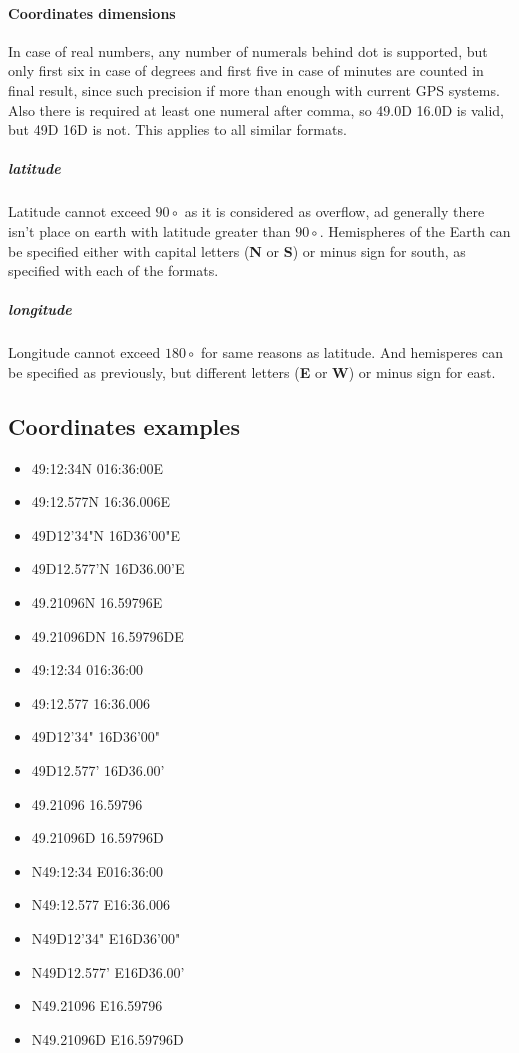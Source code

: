 \documentclass[12pt,titlepage]{article}
\begin{document}
\paragraph{Coordinates dimensions}
In case of real numbers, any number of numerals behind 
dot is supported, but only first six in case of degrees and first five in case of minutes are
counted in final result, since such precision if more than enough with current GPS systems. 
Also there is required at least one numeral after comma, so 49.0D 16.0D is valid, but 49D 16D 
is not. This applies to all similar formats.

\subparagraph{latitude}
Latitude cannot exceed $90\circ$ as it is considered as overflow, ad generally there isn't place 
on earth with latitude greater than $90\circ$. Hemispheres of the Earth can be specified either with capital letters (\textbf{N} or \textbf{S}) or minus sign for south, as specified with each of the formats.
\subparagraph{longitude}
Longitude cannot exceed $180\circ$ for same reasons as latitude. And hemisperes can be specified 
as previously, but different letters (\textbf{E} or \textbf{W}) or minus sign for east. 

\subsection{Coordinates examples}
\begin{itemize}
\item{49:12:34N 016:36:00E }
\item{49:12.577N 16:36.006E}
\item{49D12'34"N 16D36'00"E}
\item{49D12.577'N 16D36.00'E}
\item{49.21096N 16.59796E}
\item{49.21096DN 16.59796DE}
 
\item{49:12:34 016:36:00 }
\item{49:12.577 16:36.006}
\item{49D12'34" 16D36'00"}
\item{49D12.577' 16D36.00'}
\item{49.21096 16.59796}
\item{49.21096D 16.59796D}

\item{N49:12:34 E016:36:00 }
\item{N49:12.577 E16:36.006}
\item{N49D12'34" E16D36'00"}
\item{N49D12.577' E16D36.00'}
\item{N49.21096 E16.59796}
\item{N49.21096D E16.59796D}
\end{itemize}
\end{document}
